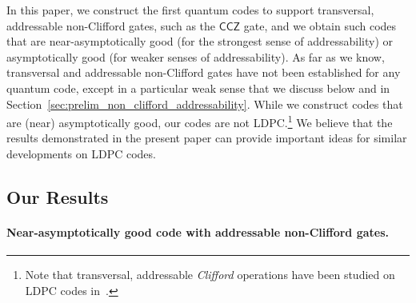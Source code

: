 \documentclass[11pt]{article}
\theoremstyle{definition}
\newcommand{\CCZ}{\mathsf{CCZ}}
\begin{document}
    In this paper, we construct the first quantum codes to support transversal, addressable non-Clifford gates, such as the $\CCZ$ gate, and we obtain such codes that are near-asymptotically good (for the strongest sense of addressability) or asymptotically good (for weaker senses of addressability). As far as we know, transversal and addressable non-Clifford gates have not been established for any quantum code, except in a particular weak sense that we discuss below and in Section~\ref{sec:prelim_non_clifford_addressability}. While we construct codes that are (near) asymptotically good, our codes are not LDPC.\footnote{Note that transversal, addressable {\em Clifford} operations have been studied on LDPC codes in~\cite{zhu2023non,hsin2024classifying}.} We believe that the results demonstrated in the present paper can provide important ideas for similar developments on LDPC codes.

    
    
    
    \subsection{Our Results}

    \paragraph{Near-asymptotically good code with addressable non-Clifford gates.}
    
\end{document}
